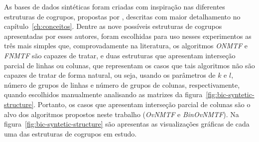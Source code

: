 \documentclass[
    12pt,                %
    oneside,            %
    a4paper,            %
    english,            %
    brazil                %
    ]{abntex2ppgsi}
\begin{document}


As bases de dados sintéticas foram criadas com inspiração nas diferentes estruturas de cogrupos, propostas por , descritas com maior detalhamento no capítulo~\ref{ch:conceitos}.
Dentre as nove possíveis estruturas de cogrupos apresentadas por esses autores, foram escolhidas para uso nesses experimentos as três mais simples que, comprovadamente na literatura, os algoritmos \textit{ONMTF} e \textit{FNMTF} são capazes de tratar, e duas estruturas que apresentam interseção parcial de linhas ou colunas, que representam os casos que tais algoritmos não são capazes de tratar de forma natural, ou seja, usando os parâmetros de $k$ e $l$, número de grupos de linhas e número de grupos de colunas, respectivamente, quando escolhidos manualmente analisando as matrizes da figura~\ref{fig:bic-syntetic-structure}.
Portanto, os casos que apresentam interseção parcial de colunas são o alvo dos algoritmos propostos neste trabalho (\textit{OvNMTF} e \textit{BinOvNMTF}).
Na figura~\ref{fig:bic-syntetic-structure} são apresentas as visualizações gráficas de cada uma das estruturas de cogrupos em estudo.
\end{document}
